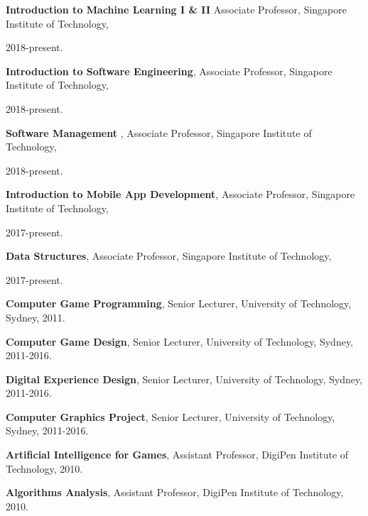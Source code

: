 \documentclass[10pt,a4paper]{article}
\renewenvironment{itemize}{
    \begin{list}{}{
            \setlength{\leftmargin}{1.5em}
            \setlength{\itemsep}{0.25em}
            \setlength{\parskip}{0pt}
            \setlength{\parsep}{0.25em}
        }
        }{
    \end{list}
}
\begin{document}
\begin{itemize}

    \item \textbf{Introduction to Machine Learning I \& II} Associate Professor, Singapore Institute of Technology,

        2018-present.

    \item \textbf{Introduction to Software Engineering},
        Associate Professor, Singapore Institute of Technology,
        
        2018-present.

    \item \textbf{Software Management },
        Associate Professor, Singapore Institute of Technology,
        
        2018-present.

    \item \textbf{Introduction to Mobile App Development},
        Associate Professor, Singapore Institute of Technology,
        
        2017-present.

    \item \textbf{Data Structures},
        Associate Professor, Singapore Institute of Technology,
        
        2017-present.

    \item \textbf{Computer Game Programming},
        Senior Lecturer, University of Technology, Sydney,
        2011.

    \item \textbf{Computer Game Design},
        Senior Lecturer, University of Technology, Sydney,
        2011-2016.

    \item \textbf{Digital Experience Design},
        Senior Lecturer, University of Technology, Sydney,
        2011-2016.

    \item \textbf{Computer Graphics Project},
        Senior Lecturer, University of Technology, Sydney,
        2011-2016.

    \item \textbf{Artificial Intelligence for Games},
        Assistant Professor, DigiPen Institute of Technology,
        2010.

    \item \textbf{Algorithms Analysis},
        Assistant Professor, DigiPen Institute of Technology,
        2010.


\end{itemize}
\end{document}
